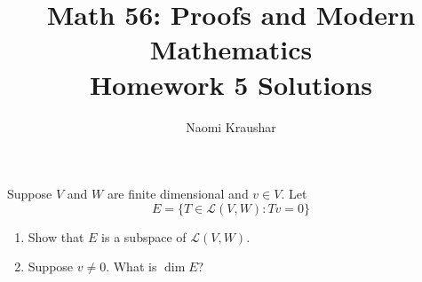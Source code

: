\documentclass[12pt]{article}
\theoremstyle{definition}
\theoremstyle{definition}
\begin{document}
\title{Math 56: Proofs and Modern Mathematics\\ Homework 5 Solutions}
\author{Naomi Kraushar}
\maketitle

\begin{prob}[Axler 3.D.7]
Suppose $V$ and $W$ are finite dimensional and $v\in V$. Let 
\[E=\{T\in\mathcal{L}(V,W):Tv=0\}\]
\begin{enumerate}[label=\arabic*.]
\item Show that $E$ is a subspace of $\mathcal{L}(V,W)$.

\item Suppose $v\neq0$. What is $\dim E$?
\end{enumerate}
\end{prob}
\end{document}
